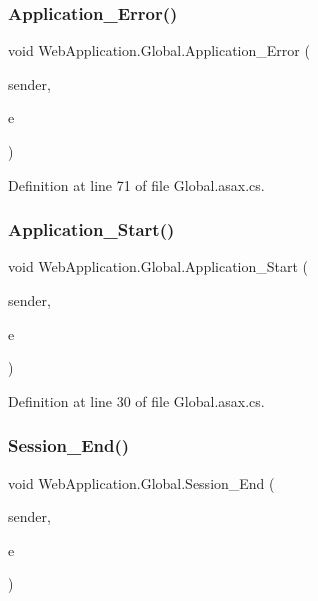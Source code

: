 \subsubsection{\texorpdfstring{Application\_Error()}{Application\_Error()}}
{\footnotesize\ttfamily void Web\+Application.\+Global.\+Application\+\_\+\+Error (\begin{DoxyParamCaption}\item[{object}]{sender,  }\item[{Event\+Args}]{e }\end{DoxyParamCaption})\hspace{0.3cm}{\ttfamily [protected]}}



Definition at line 71 of file Global.\+asax.\+cs.

\mbox{\label{classWebApplication_1_1Global_a138ffd46dafd12c3e22b7bc70c4e4238}} 
\subsubsection{\texorpdfstring{Application\_Start()}{Application\_Start()}}
{\footnotesize\ttfamily void Web\+Application.\+Global.\+Application\+\_\+\+Start (\begin{DoxyParamCaption}\item[{object}]{sender,  }\item[{Event\+Args}]{e }\end{DoxyParamCaption})\hspace{0.3cm}{\ttfamily [protected]}}



Definition at line 30 of file Global.\+asax.\+cs.

\mbox{\label{classWebApplication_1_1Global_ac730b53f2e5ac5b5981b2aabd4cdad1a}} 
\subsubsection{\texorpdfstring{Session\_End()}{Session\_End()}}
{\footnotesize\ttfamily void Web\+Application.\+Global.\+Session\+\_\+\+End (\begin{DoxyParamCaption}\item[{object}]{sender,  }\item[{Event\+Args}]{e }\end{DoxyParamCaption})\hspace{0.3cm}{\ttfamily [protected]}}



